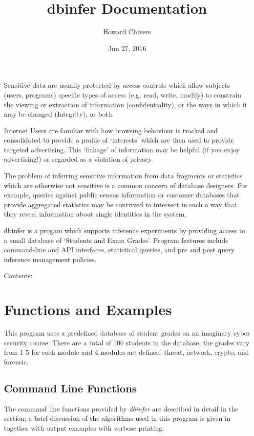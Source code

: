 \documentclass[a4paper,11pt,english]{sphinxmanual}
\title{dbinfer Documentation}
\date{Jun 27, 2016}
\author{Howard Chivers}
\begin{document}
\maketitle
\tableofcontents
{}\label{index::doc}


Sensitive data are usually protected by access controls which allow
subjects (users, programs) specific types of access (e.g. read, write,
modify) to constrain the viewing or extraction of information
(confidentiality), or the ways in which it may be changed
(Integrity), or both.

Internet Users are familiar with how browsing behaviour is
tracked and consolidated to provide a profile of `interests'
which are then used to provide targeted advertising. This
`linkage' of information may be helpful (if you enjoy
advertising!) or regarded as a violation of privacy.

The problem of inferring sensitive information from data
fragments or statistics which are otherwise not sensitive is a
common concern of database designers. For example, queries
against public census information or customer databases that
provide aggregated statistics may be contrived to intersect in
such a way that they reveal information about single identities
in the system.

dbinfer is a progam which supports inference experiments by
providing access to a small database of `Students and Exam
Grades'. Program features include command-line and API
interfaces, statistical queries, and pre and post query
inference management policies.

Contents:


\chapter{Functions and Examples}
\label{examples:ref-examples}\label{examples:cyber-practicals-dbinfer}\label{examples:functions-and-examples}\label{examples::doc}
This program uses a predefined database of student grades on an imaginary cyber security course.
There are a total of 100 students in the database; the grades vary from 1-5 for each module
and 4 modules are defined: threat, network, crypto, and forensic.


\section{Command Line Functions}
\label{examples:command-line-functions}
The command line functions provided by \emph{dbinfer} are described in detail in the
{\hyperref[reference:ref\string-reference]{}} section; a brief discussion of the algorithms used in this
program is given in {\hyperref[algorithms:ref\string-algorithms]{}} together with output examples with verbose
printing.
\end{document}
